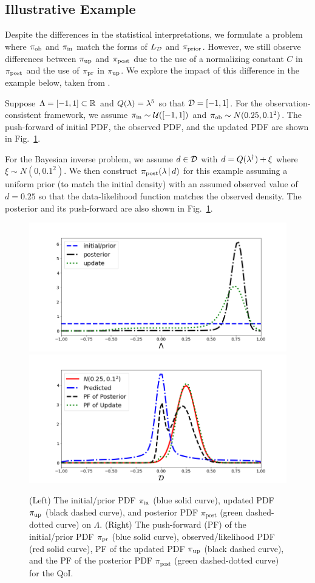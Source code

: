 \subsection{Illustrative Example}
Despite the differences in the statistical interpretations, we formulate a problem where $\operatorname*{\pi_{ob}}$ and $\operatorname*{\pi_{in}}$ match the forms of $L_{\mathcal{D}}$ and $\operatorname*{\pi_{prior}}$.
However, we still observe differences between $\operatorname*{\pi_{up}}$ and $\operatorname*{\pi_{post}}$ due to the use of a normalizing constant $C$ in $\operatorname*{\pi_{post}}$ and the use of $\operatorname*{\pi_{pr}}$ in $\operatorname*{\pi_{up}}$.
We explore the impact of this difference in the example below, taken from \cite{BJW18}.



\begin{ex}
Suppose ${\Lambda} = [-1,1]\subset\mathbb{R}$ and $Q(\lambda)=\lambda^5$ so that $\mathcal{D} = [-1,1]$.
For the observation-consistent framework, we assume $\operatorname*{\pi_{in}}\sim \mathcal{U}([-1,1])$ and $\operatorname*{\pi_{ob}}\sim N(0.25,0.1^2)$.
The push-forward of initial PDF, the observed PDF, and the updated PDF are shown in Fig.~\ref{fig:bayes-comparison}.

For the Bayesian inverse problem, we assume $d\in \mathcal{D}$ with $d=Q(\lambda^\dagger)+\xi$ where $\xi\sim N(0,0.1^2)$.
We then construct $\pi_{\text{post}}(\lambda \, |\, d)$ for this example assuming a uniform prior (to match the initial density) with an assumed observed value of $d=0.25$ so that the data-likelihood function matches the observed density.
The posterior and its push-forward are also shown in Fig.~\ref{fig:bayes-comparison}.


\begin{figure}[htbp]
\centering
   \includegraphics[width=0.49\linewidth]{figures/bip-vs-sip-1.png}
   \includegraphics[width=0.49\linewidth]{figures/bip-vs-sip-pf-1.png}
 \caption{(Left) The initial/prior PDF $\operatorname*{\pi_{in}}$ (blue solid curve), updated PDF $\operatorname*{\pi_{up}}$ (black dashed curve), and posterior PDF $\pi_\text{post}$ (green dashed-dotted curve) on $\Lambda$.
 (Right) The push-forward (PF) of the initial/prior PDF $\operatorname*{\pi_{pr}}$ (blue solid curve), observed/likelihood PDF (red solid curve), PF of the updated PDF $\operatorname*{\pi_{up}}$ (black dashed curve), and the PF of the posterior PDF $\pi_\text{post}$ (green dashed-dotted curve) for the QoI.}
 \label{fig:bayes-comparison}
\end{figure}



\end{ex}
